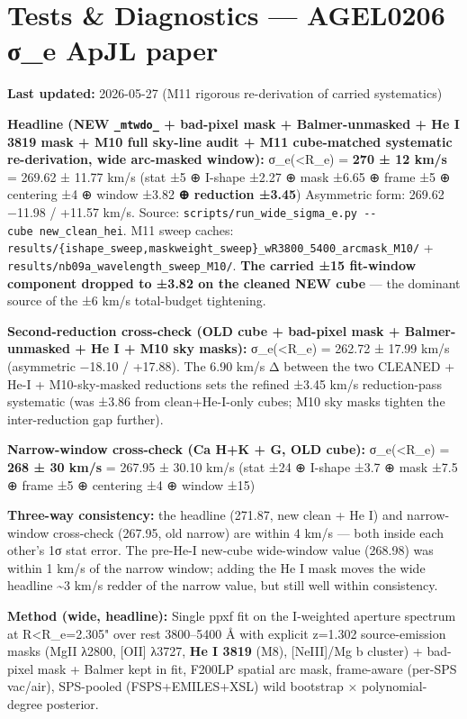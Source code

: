 \documentclass[
  10pt,
]{article}
\author{}
\date{}
\begin{document}
\sloppy

\hypertarget{tests-diagnostics-agel0206-ux3c3_e-apjl-paper}{%
\section{Tests \& Diagnostics --- AGEL0206 σ\_e ApJL paper}\label{tests-diagnostics-agel0206-ux3c3_e-apjl-paper}}

\textbf{Last updated:} 2026-05-27 (M11 rigorous re-derivation of carried systematics)

\textbf{Headline (NEW \texttt{\_mtwdo\_} + bad-pixel mask + Balmer-unmasked + He I 3819 mask + M10 full sky-line audit + M11 cube-matched systematic re-derivation, wide arc-masked window):}
σ\_e(\textless R\_e) = \textbf{270 ± 12 km/s} = 269.62 ± 11.77 km/s (stat ±5 ⊕ I-shape ±2.27 ⊕ mask ±6.65 ⊕ frame ±5 ⊕ centering ±4 ⊕ window ±3.82 \textbf{⊕ reduction ±3.45}) Asymmetric form: 269.62
−11.98 / +11.57 km/s. Source: \texttt{scripts/run\_wide\_sigma\_e.py\ -\/-cube\ new\_clean\_hei}. M11 sweep caches: \texttt{results/\{ishape\_sweep,maskweight\_sweep\}\_wR3800\_5400\_arcmask\_M10/} +
\texttt{results/nb09a\_wavelength\_sweep\_M10/}. \textbf{The carried ±15 fit-window component dropped to ±3.82 on the cleaned NEW cube} --- the dominant source of the ±6 km/s total-budget tightening.

\textbf{Second-reduction cross-check (OLD cube + bad-pixel mask + Balmer-unmasked + He I + M10 sky masks):} σ\_e(\textless R\_e) = 262.72 ± 17.99 km/s (asymmetric −18.10 / +17.88). The 6.90 km/s Δ
between the two CLEANED + He-I + M10-sky-masked reductions sets the refined ±3.45 km/s reduction-pass systematic (was ±3.86 from clean+He-I-only cubes; M10 sky masks tighten the inter-reduction gap
further).

\textbf{Narrow-window cross-check (Ca H+K + G, OLD cube):} σ\_e(\textless R\_e) = \textbf{268 ± 30 km/s} = 267.95 ± 30.10 km/s (stat ±24 ⊕ I-shape ±3.7 ⊕ mask ±7.5 ⊕ frame ±5 ⊕ centering ±4 ⊕ window
±15)

\textbf{Three-way consistency:} the headline (271.87, new clean + He I) and narrow-window cross-check (267.95, old narrow) are within 4 km/s --- both inside each other's 1σ stat error. The pre-He-I
new-cube wide-window value (268.98) was within 1 km/s of the narrow window; adding the He I mask moves the wide headline \textasciitilde3 km/s redder of the narrow value, but still well within
consistency.

\textbf{Method (wide, headline):} Single ppxf fit on the I-weighted aperture spectrum at R\textless R\_e=2.305" over rest 3800--5400 Å with explicit z=1.302 source-emission masks (MgII λ2800,
{[}OII{]} λ3727, \textbf{He I 3819} (M8), {[}NeIII{]}/Mg b cluster) + bad-pixel mask + Balmer kept in fit, F200LP spatial arc mask, frame-aware (per-SPS vac/air), SPS-pooled (FSPS+EMILES+XSL) wild
bootstrap × polynomial-degree posterior.
\end{document}

